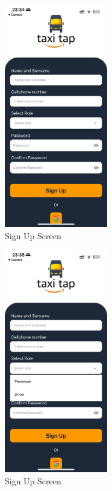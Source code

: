 \documentclass[12pt]{article}
\begin{document}
\begin{figure}[H]
  \centering
  \includegraphics[width=0.4\textwidth]{signup2.png}
  \caption{Sign Up Screen}
\end{figure}

\begin{figure}[H]
  \centering
  \includegraphics[width=0.4\textwidth]{signup_roles.png}
  \caption{Sign Up Screen}
\end{figure}
\end{document}
